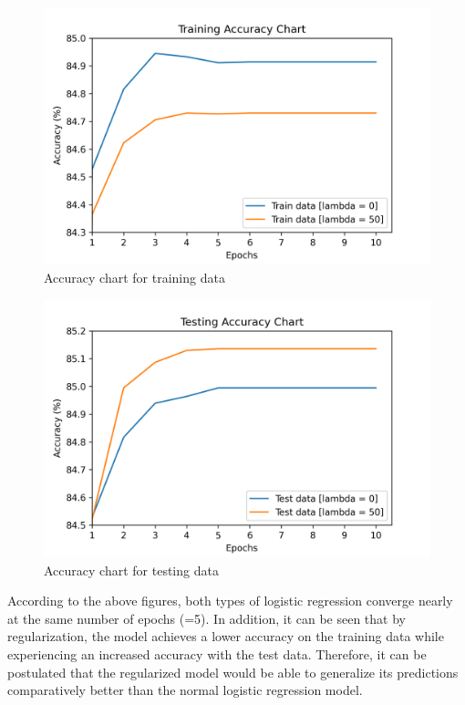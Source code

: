 \documentclass[12pt,a4paper]{article}
\begin{document}
	\vspace{-0.4cm}
	\begin{figure}[H]
		\centering
		\includegraphics[scale=.63]{Figures/Acc_train}
		\caption{Accuracy chart for training data}
	\end{figure}
	
	\vspace{-0.6cm}
	\begin{figure}[H]
		\centering
		\includegraphics[scale=.63]{Figures/Acc_test}
		\caption{Accuracy chart for testing data}
	\end{figure}
	
	\vspace{-0.4cm}
	\noindent According to the above figures, both types of logistic regression converge nearly at the same number of epochs (=5). In addition, it can be seen that by regularization, the model achieves a lower accuracy on the training data while experiencing an increased accuracy with the test data. Therefore, it can be postulated that the regularized model would be able to generalize its predictions comparatively better than the normal logistic regression model. 
	
\end{document}
